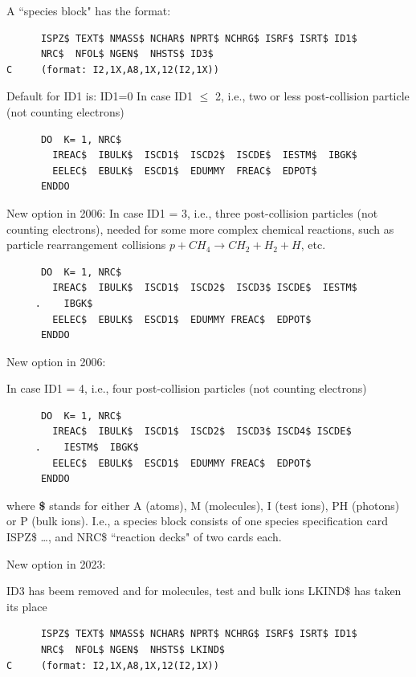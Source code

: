 A ``species block" has the format:

\begin{lstlisting}
      ISPZ$ TEXT$ NMASS$ NCHAR$ NPRT$ NCHRG$ ISRF$ ISRT$ ID1$
      NRC$  NFOL$ NGEN$  NHSTS$ ID3$
C     (format: I2,1X,A8,1X,12(I2,1X))
\end{lstlisting}

Default for ID1 is:  ID1=0 In case ID1 $\leq$ 2, i.e., two or less
post-collision particle (not counting electrons)

\begin{lstlisting}
      DO  K= 1, NRC$
        IREAC$  IBULK$  ISCD1$  ISCD2$  ISCDE$  IESTM$  IBGK$
        EELEC$  EBULK$  ESCD1$  EDUMMY  FREAC$  EDPOT$
      ENDDO
\end{lstlisting}

New option in 2006:
In case ID1 = 3, i.e., three post-collision particles (not counting electrons),
needed for some more complex chemical reactions, such as particle rearrangement
collisions $p + CH_4 \rightarrow CH_2 + H_2 + H$, etc.

\begin{lstlisting}
      DO  K= 1, NRC$
        IREAC$  IBULK$  ISCD1$  ISCD2$  ISCD3$ ISCDE$  IESTM$
     .    IBGK$
        EELEC$  EBULK$  ESCD1$  EDUMMY FREAC$  EDPOT$
      ENDDO
\end{lstlisting}

New option in 2006:

In case ID1 = 4, i.e., four post-collision particles (not counting electrons)

\begin{lstlisting}
      DO  K= 1, NRC$
        IREAC$  IBULK$  ISCD1$  ISCD2$  ISCD3$ ISCD4$ ISCDE$
     .    IESTM$  IBGK$
        EELEC$  EBULK$  ESCD1$  EDUMMY FREAC$  EDPOT$
      ENDDO
\end{lstlisting}

where \textbf{\$} stands for either A (atoms), M (molecules), I (test ions), PH
(photons) or P (bulk ions).
I.e., a species block consists of one species specification card ISPZ\$ \dots,
and NRC\$ ``reaction decks" of two cards each.

New option in 2023:

ID3 has beem removed and for molecules, test and bulk ions LKIND\$ has taken
its place

\begin{lstlisting}
      ISPZ$ TEXT$ NMASS$ NCHAR$ NPRT$ NCHRG$ ISRF$ ISRT$ ID1$
      NRC$  NFOL$ NGEN$  NHSTS$ LKIND$
C     (format: I2,1X,A8,1X,12(I2,1X))
\end{lstlisting}


